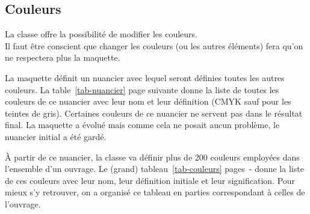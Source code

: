 \documentclass[nocrop]{sesamanuel}
\begin{document}
\subsection{Couleurs}
\label{subsec-couleurs}
La classe offre la possibilité de modifier les couleurs. \\Il faut être
conscient que changer les couleurs (ou les autres éléments) fera qu'on
ne respectera plus la maquette.

La maquette définit un nuancier avec lequel seront définies toutes les
autres couleurs. La table~\ref{tab-nuancier} page suivante donne la
liste de toutes les couleurs de ce nuancier avec leur nom et leur
définition (CMYK sauf pour les teintes de gris).
Certaines couleurs de ce nuancier ne servent pas dans le résultat
final. La maquette a évolué mais comme cela ne posait aucun problème, le
nuancier initial a été gardé.  

À partir de ce nuancier, la classe va définir plus de 200 couleurs
employées dans l'ensemble d'un ouvrage. Le (grand)
tableau~\ref{tab-couleurs}
pages~\pageref{tab-debut-couleur}-\pageref{tab-couleurs} donne la
liste de ces couleurs avec leur nom, leur définition initiale et leur
signification. Pour mieux s'y retrouver, on a organisé ce tableau en
parties correspondant à celles de l'ouvrage.
\end{document}
